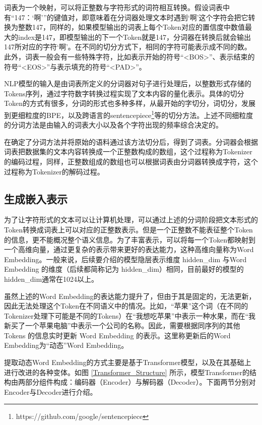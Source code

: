 词表为一个映射，可以将正整数与字符形式的词符相互转换。假设词表中有“147：‘啊’”的键值对，即意味着在分词器处理文本时遇到‘啊’这个字符会把它转换为整数147，同样的，如果模型输出的词表上每个Token对应的置信度中数值最大的index是147，即模型输出的下一个Token就是147，分词器在转换后就会输出147所对应的字符‘啊’。在不同的切分方式下，相同的字符可能表示成不同的数。此外，词表一般会有一些特殊字符，比如表示开始的符号“<BOS>”、表示结束的符号“<EOS>”与表示填充的符号“<PAD>”。

NLP模型的输入是由词表所定义的分词器对句子进行处理后，以整数形式存储的Tokens序列，通过字符数字转换过程实现了文本内容的量化表示。具体的切分Token的方式有很多，分词的形式也多种多样，从最开始的字切分，词切分，发展到更细粒度的BPE\cite{NMTBPE}，以及跨语言的sentencepiece\footnote{https://github.com/google/sentencepiece}等的切分方法。上述不同细粒度的分词方法是由输入的词表大小以及各个字符出现的频率综合决定的。

在确定了分词方法并将原始的语料通过该方法切分后，得到了词表。分词器会根据词表把数据集的文本内容转换成一个正整数构成的数组，这个过程称为Tokenizer的编码过程，同样，正整数组成的数组也可以根据词表由分词器转换成字符，这个过程称为Tokenizer的解码过程。

\subsection{生成嵌入表示} \label{generate_word_embd}

为了让字符形式的文本可以让计算机处理，可以通过上述的分词阶段把文本形式的Token转换成词表上可以对应的正整数表示。但是一个正整数不能表征整个Token的信息，更不能概况整个语义信息。为了丰富表示，可以将每一个Token都映射到一个高维向量，通过更复杂的表示带来更好的表达能力，这种高维向量称为Word Embedding。一般来说，后续要介绍的模型隐层表示维度 hidden\_dim 与Word Embedding 的维度（后续都简称记为 hidden\_dim）相同，目前最好的模型的hidden\_dim通常在1024以上。

虽然上述的Word Embedding的表达能力提升了，但由于其是固定的，无法更新，因此无法处理这个Token在不同语义中的情况。比如，“苹果”这个词（在不同的Tokenizer处理下可能是不同的Tokens）在“我想吃苹果”中表示一种水果，而在“我新买了一个苹果电脑”中表示一个公司的名称。因此，需要根据同序列的其他 Tokens 的信息实时更新 Word Embedding 的表示。这里称更新后的Word Embedding为“动态”Word Embedding。

提取动态Word Embedding的方式主要是基于Transformer\cite{Attn_is_all_you_need}模型，以及在其基础上进行改进的各种变体\cite{BERT, GPT2, GPT3}。如图 \ref{Transformer_Structure} 所示，模型Transformer\cite{Attn_is_all_you_need}的结构由两部分组件构成：编码器（Encoder）与解码器（Decoder）。下面两节分别对Encoder与Decoder进行介绍。


